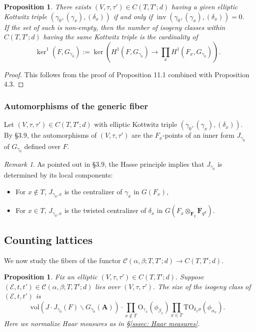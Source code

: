 \documentclass[reqno]{amsart}
\numberwithin{equation}{section}
\newcommand{\F}{\mathbf{F}}
\newcommand{\Cal}[1]{\mathcal{#1}}
\newcommand{\A}{\mathbf{A}}
\newcommand{\mrm}[1]{\mathrm{#1}}
\DeclareMathOperator{\inv}{inv}
\newtheorem{prop}[thm]{Proposition}
\theoremstyle{remark}
\newtheorem{remark}[thm]{Remark}
\numberwithin{equation}{section}
\begin{document}
\begin{prop}\label{prop: gen fibers}
There exists $(V,\tau, \tau') \in C(T,T'; d)$ having a given elliptic Kottwitz triple $(\gamma_0, (\gamma_x), (\delta_x))$ if and only if $\inv (\gamma_0, (\gamma_x), (\delta_x)) = 0$. If the set of such is non-empty, then the number of isogeny classes within $C(T,T'; d)$ having the same Kottwitz triple is the cardinality of 
\[
\ker^1(F,G_{\gamma_0}) := \ker (H^1(F,G_{\gamma_0}) \rightarrow \prod_x H^1(F_x, G_{\gamma_0})).
\]
\end{prop}

\begin{proof}
This follows from the proof of \cite{NgoNgo} Proposition 11.1 combined with \cite{Ngo13} Proposition 4.3. 
\end{proof}



\subsubsection{Automorphisms of the generic fiber}\label{sssec: aut generic fib}

Let $(V, \tau, \tau') \in  C(T,T';d)$ with elliptic Kottwitz triple $(\gamma_0, (\gamma_x) , (\delta_x))$. By \cite{Ngo13} \S 3.9, the automorphisms of $(V, \tau, \tau')$ are the $F_x$-points of an inner form $J_{\gamma_0}$ of $G_{\gamma_0}$ defined over $F$. 

\begin{remark}\label{inner form local} As pointed out in \cite{Ngo13} \S 3.9, the Hasse principle implies that $J_{\gamma_0}$ is determined by its local components: 
\begin{itemize}
\item For $x \notin T$, $J_{\gamma_0,x}$ is the centralizer of $\gamma_x$ in $G(F_x)$, 
\item For $x \in T$, $J_{\gamma_0,x}$ is the twisted centralizer of $\delta_x$ in $G(F_x \otimes_{\F_q} \F_{q^d})$.
\end{itemize}
\end{remark}

\subsection{Counting lattices}

We now study the fibers of the functor $\Cal{C}(\alpha, \beta; T,T'; d) \rightarrow  C(T,T';d)$. 

\begin{prop}\label{prop: lattice count}
Fix an elliptic $(V, \tau, \tau') \in C(T,T';d)$. Suppose $(\Cal{E}, t, t') \in \Cal{C}(\alpha, \beta; T,T'; d)$ lies over $(V, \tau, \tau')$. The size of the isogeny class of $(\Cal{E}, t, t')$ is 
\[
 \mrm{vol}(J \cdot J_{\gamma_0}(F) \backslash G_{\gamma_0}(\A)) \cdot  \prod_{x \notin T} \mrm{O}_{\gamma_x}(\phi_{\beta_x}) \prod_{x \in  T} \mrm{TO}_{\delta_x \sigma}(\phi_{\alpha_x}). 
\]
Here we normalize Haar measures as in \S \ref{sssec: Haar measures}.
\end{prop}
\end{document}
